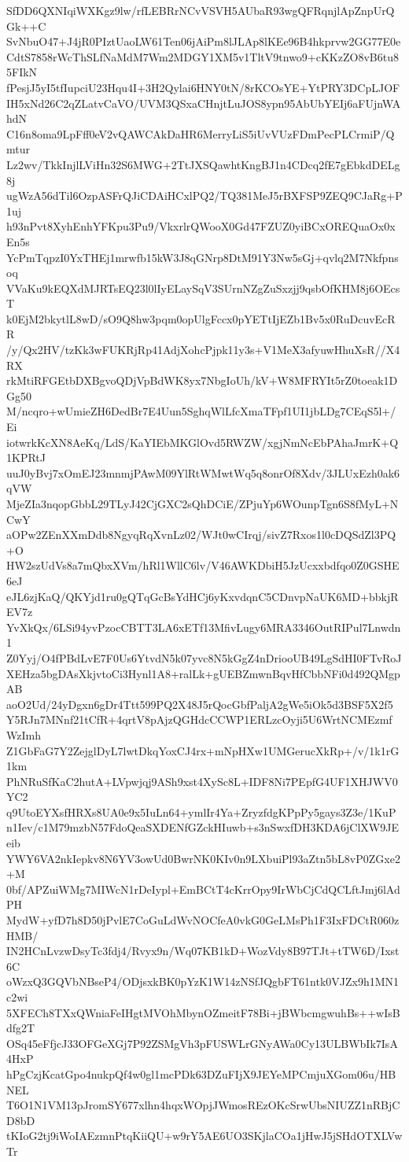 SfDD6QXNIqiWXKgz9lw/rfLEBRrNCvVSVH5AUbaR93wgQFRqnjlApZnpUrQGk++C
SvNbuO47+J4jR0PIztUaoLW61Ten06jAiPm8lJLAp8lKEe96B4hkprvw2GG77E0e
CdtS7858rWcThSLfNaMdM7Wm2MDGY1XM5v1TltV9tnwo9+cKKzZO8vB6tu85FIkN
fPesjJ5yI5tfIupciU23Hqu4I+3H2Qylai6HNY0tN/8rKCOsYE+YtPRY3DCpLJOF
IH5xNd26C2qZLatvCaVO/UVM3QSxaCHnjtLuJOS8ypn95AbUbYEIj6aFUjnWAhdN
C16n8oma9LpFff0eV2vQAWCAkDaHR6MerryLiS5iUvVUzFDmPecPLCrmiP/Qmtur
Lz2wv/TkkInjlLViHn32S6MWG+2TtJXSQawhtKngBJ1n4CDcq2fE7gEbkdDELg8j
ugWzA56dTil6OzpASFrQJiCDAiHCxlPQ2/TQ381MeJ5rBXFSP9ZEQ9CJaRg+P1uj
h93nPvt8XyhEnhYFKpu3Pu9/VkxrlrQWooX0Gd47FZUZ0yiBCxOREQuaOx0xEn5s
YcPmTqpzI0YxTHEj1mrwfb15kW3J8qGNrp8DtM91Y3Nw5sGj+qvlq2M7Nkfpnsoq
VVaKu9kEQXdMJRTsEQ23l0lIyELaySqV3SUrnNZgZuSxzjj9qsbOfKHM8j6OEcsT
k0EjM2bkytlL8wD/sO9Q8hw3pqm0opUlgFccx0pYETtIjEZb1Bv5x0RuDcuvEcRR
/y/Qx2HV/tzKk3wFUKRjRp41AdjXohcPjpk11y3s+V1MeX3afyuwHhuXsR//X4RX
rkMtiRFGEtbDXBgvoQDjVpBdWK8yx7NbgIoUh/kV+W8MFRYIt5rZ0toeak1DGg50
M/ncqro+wUmieZH6DedBr7E4Uun5SghqWlLfcXmaTFpf1UI1jbLDg7CEqS5l+/Ei
iotwrkKcXN8AeKq/LdS/KaYIEbMKGlOvd5RWZW/xgjNmNcEbPAhaJmrK+Q1KPRtJ
uuJ0yBvj7xOmEJ23mnmjPAwM09YlRtWMwtWq5q8onrOf8Xdv/3JLUxEzh0ak6qVW
MjeZIa3nqopGbbL29TLyJ42CjGXC2sQhDCiE/ZPjuYp6WOunpTgn6S8fMyL+NCwY
aOPw2ZEnXXmDdb8NgyqRqXvnLz02/WJt0wCIrqj/sivZ7Rxos1l0cDQSdZl3PQ+O
HW2szUdVs8a7mQbxXVm/hRl1WllC6lv/V46AWKDbiH5JzUcxxbdfqo0Z0GSHE6eJ
eJL6zjKaQ/QKYjd1ru0gQTqGcBsYdHCj6yKxvdqnC5CDnvpNaUK6MD+bbkjREV7z
YvXkQx/6LSi94yvPzocCBTT3LA6xETf13MfivLugy6MRA3346OutRIPul7Lnwdn1
Z0Yyj/O4fPBdLvE7F0Us6YtvdN5k07yvc8N5kGgZ4nDriooUB49LgSdHI0FTvRoJ
XEHza5bgDAsXkjvtoCi3Hynl1A8+ralLk+gUEBZmwnBqvHfCbbNFi0d492QMgpAB
aoO2Ud/24yDgxn6gDr4Ttt599PQ2X48J5rQocGbfPaljA2gWe5iOk5d3BSF5X2f5
Y5RJn7MNnf21tCfR+4qrtV8pAjzQGHdcCCWP1ERLzcOyji5U6WrtNCMEzmfWzImh
Z1GbFaG7Y2ZejglDyL7lwtDkqYoxCJ4rx+mNpHXw1UMGerucXkRp+/v/1k1rG1km
PhNRuSfKaC2hutA+LVpwjqj9ASh9xst4XySc8L+IDF8Ni7PEpfG4UF1XHJWV0YC2
q9UtoEYXsfHRXs8UA0e9x5IuLn64+ymlIr4Ya+ZryzfdgKPpPy5gays3Z3e/1KuP
n1Iev/c1M79mzbN57FdoQeaSXDENfGZckHIuwb+s3nSwxfDH3KDA6jClXW9JEeib
YWY6VA2nkIepkv8N6YV3owUd0BwrNK0KIv0n9LXbuiPl93aZtn5bL8vP0ZGxe2+M
0bf/APZuiWMg7MIWcN1rDeIypl+EmBCtT4cKrrOpy9IrWbCjCdQCLftJmj6lAdPH
MydW+yfD7h8D50jPvlE7CoGuLdWvNOCfeA0vkG0GeLMsPh1F3IxFDCtR060zHMB/
IN2HCnLvzwDsyTc3fdj4/Rvyx9n/Wq07KB1kD+WozVdy8B97TJt+tTW6D/Ixst6C
oWzxQ3GQVbNBseP4/ODjsxkBK0pYzK1W14zNSfJQgbFT61ntk0VJZx9h1MN1c2wi
5XFECh8TXxQWniaFeIHgtMVOhMbynOZmeitF78Bi+jBWbcmgwuhBs++wIsBdfg2T
OSq45eFfjcJ33OFGeXGj7P92ZSMgVh3pFUSWLrGNyAWa0Cy13ULBWbIk7IsA4HxP
hPgCzjKcatGpo4nukpQf4w0gl1mcPDk63DZuFIjX9JEYeMPCmjuXGom06u/HBNEL
T6O1N1VM13pJromSY677xlhn4hqxWOpjJWmosREzOKcSrwUbsNIUZZ1nRBjCD8bD
tKIoG2tj9iWoIAEzmnPtqKiiQU+w9rY5AE6UO3SKjlaCOa1jHwJ5jSHdOTXLVwTr
